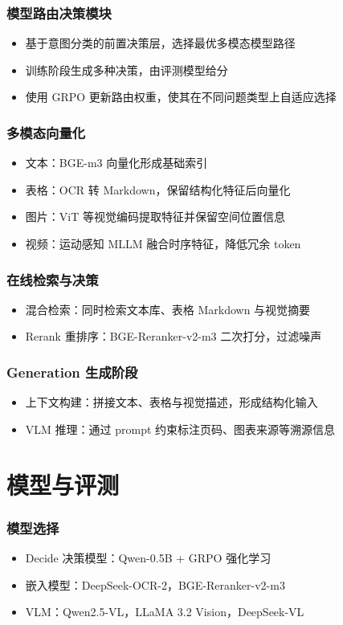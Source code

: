 \documentclass[AutoFakeBold,AutoFakeSlant]{beamer}
\begin{document}
\begin{frame}
  \frametitle{模型路由决策模块}
  \begin{itemize}
    \item 基于意图分类的前置决策层，选择最优多模态模型路径
    \item 训练阶段生成多种决策，由评测模型给分
    \item 使用 GRPO 更新路由权重，使其在不同问题类型上自适应选择
  \end{itemize}
\end{frame}

\begin{frame}
  \frametitle{多模态向量化}
  \begin{itemize}
    \item 文本：BGE-m3 向量化形成基础索引
    \item 表格：OCR 转 Markdown，保留结构化特征后向量化
    \item 图片：ViT 等视觉编码提取特征并保留空间位置信息
    \item 视频：运动感知 MLLM 融合时序特征，降低冗余 token
  \end{itemize}
\end{frame}

\begin{frame}
  \frametitle{在线检索与决策}
  \begin{itemize}
    \item 混合检索：同时检索文本库、表格 Markdown 与视觉摘要
    \item Rerank 重排序：BGE-Reranker-v2-m3 二次打分，过滤噪声
  \end{itemize}
\end{frame}

\begin{frame}
  \frametitle{Generation 生成阶段}
  \begin{itemize}
    \item 上下文构建：拼接文本、表格与视觉描述，形成结构化输入
    \item VLM 推理：通过 prompt 约束标注页码、图表来源等溯源信息
  \end{itemize}
\end{frame}

\section{模型与评测}

\begin{frame}
  \frametitle{模型选择}
  \begin{itemize}
    \item Decide 决策模型：Qwen-0.5B + GRPO 强化学习
    \item 嵌入模型：DeepSeek-OCR-2，BGE-Reranker-v2-m3
    \item VLM：Qwen2.5-VL，LLaMA 3.2 Vision，DeepSeek-VL
  \end{itemize}
\end{frame}
\end{document}
